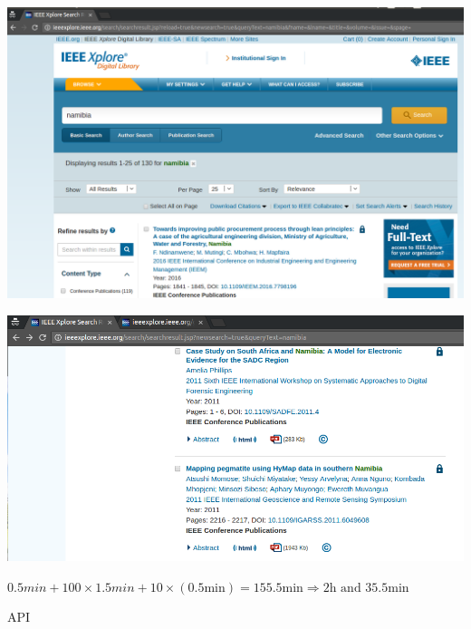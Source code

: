 \documentclass{beamer}
\begin{document}
\begin{frame}
\begin{center}
    \includegraphics[width=\textwidth]{static/ieee_search.png}
\end{center}
\end{frame}

\begin{frame}
\begin{center}
    \includegraphics[width=\textwidth]{static/namibia_search.png}
\end{center}
\end{frame}

\begin{frame}
\begin{center}
\color{yellow!79}\Large{$0.5 min + \textrm{100} \times 1.5 min + 10 \times (0.5
\textrm{min})= 155.5 \textrm{min} \Rightarrow 2 \textrm{h} \textrm{ and } 35.5
\textrm{min}$}
\end{center}
\end{frame}

\begin{frame}
\begin{center}
\Huge{API}
\end{center}
\end{frame}
\end{document}
